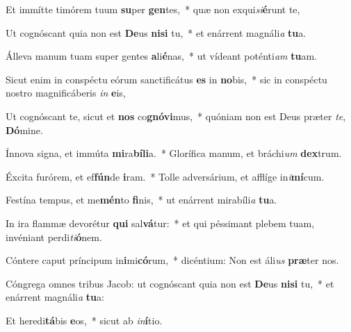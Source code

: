 \item Et immítte timórem tuum \textbf{su}per \textbf{gen}tes,~* quæ non exqui\textit{si}\textbf{é}runt te,
\item Ut cognóscant quia non est \textbf{De}us \textbf{ni}\textbf{si} tu,~* et enárrent magnáli\textit{a} \textbf{tu}a.
\item Álleva manum tuam super gentes \textbf{a}li\textbf{é}nas,~* ut vídeant poténti\textit{am} \textbf{tu}am.
\item Sicut enim in conspéctu eórum sanctificátus \textbf{es} in \textbf{no}bis,~* sic in conspéctu nostro magnificáberis \textit{in} \textbf{e}is,
\item Ut cognóscant te, sicut et \textbf{nos} co\textbf{gnó}\textbf{vi}mus,~* quóniam non est Deus præter \textit{te}, \textbf{Dó}mine.
\item Ínnova signa, et immúta \textbf{mi}ra\textbf{bí}\textbf{li}a.~* Glorífica manum, et bráchi\textit{um} \textbf{dex}trum.
\item Éxcita furórem, et ef\textbf{fún}de \textbf{i}ram.~* Tolle adversárium, et afflíge in\textit{i}\textbf{mí}cum.
\item Festína tempus, et me\textbf{mén}to \textbf{fi}nis,~* ut enárrent mirabíli\textit{a} \textbf{tu}a.
\item In ira flammæ devorétur \textbf{qui} sal\textbf{vá}tur:~* et qui péssimant plebem tuam, invéniant perdi\textit{ti}\textbf{ó}nem.
\item Cóntere caput príncipum in\textbf{i}mi\textbf{có}rum,~* dicéntium: Non est áli\textit{us} \textbf{præ}ter nos.
\item Cóngrega omnes tribus Jacob: ut cognóscant quia non est \textbf{De}us \textbf{ni}\textbf{si} tu,~* et enárrent magnáli\textit{a} \textbf{tu}a:
\item Et heredi\textbf{tá}bis \textbf{e}os,~* sicut ab \textit{in}\textbf{í}tio.
